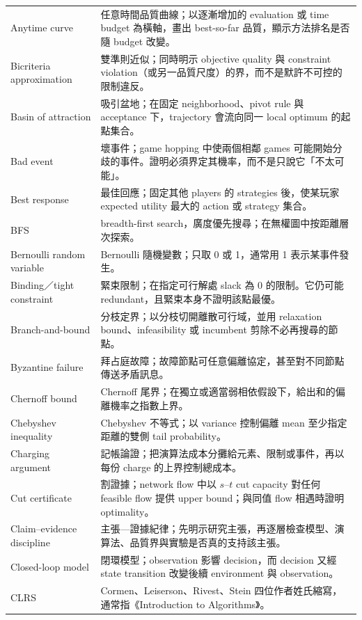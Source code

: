 \documentclass[11pt,a4paper,oneside,openany]{book}
\begin{document}
\begin{longtable}{@{}>{\raggedright\arraybackslash}p{}p{}@{}}
Anytime curve & 任意時間品質曲線；以逐漸增加的 evaluation 或 time budget 為橫軸，畫出 best-so-far 品質，顯示方法排名是否隨 budget 改變。 \\
Bicriteria approximation & 雙準則近似；同時明示 objective quality 與 constraint violation（或另一品質尺度）的界，而不是默許不可控的限制違反。 \\
Basin of attraction & 吸引盆地；在固定 neighborhood、pivot rule 與 acceptance 下，trajectory 會流向同一 local optimum 的起點集合。 \\
Bad event & 壞事件；game hopping 中使兩個相鄰 games 可能開始分歧的事件。證明必須界定其機率，而不是只說它「不太可能」。 \\
Best response & 最佳回應；固定其他 players 的 strategies 後，使某玩家 expected utility 最大的 action 或 strategy 集合。 \\
BFS & breadth-first search，廣度優先搜尋；在無權圖中按距離層次探索。 \\
Bernoulli random variable & Bernoulli 隨機變數；只取 0 或 1，通常用 1 表示某事件發生。 \\
Binding／tight constraint & 緊束限制；在指定可行解處 slack 為 0 的限制。它仍可能 redundant，且緊束本身不證明該點最優。 \\
Branch-and-bound & 分枝定界；以分枝切開離散可行域，並用 relaxation bound、infeasibility 或 incumbent 剪除不必再搜尋的節點。 \\
Byzantine failure & 拜占庭故障；故障節點可任意偏離協定，甚至對不同節點傳送矛盾訊息。 \\
Chernoff bound & Chernoff 尾界；在獨立或適當弱相依假設下，給出和的偏離機率之指數上界。 \\
Chebyshev inequality & Chebyshev 不等式；以 variance 控制偏離 mean 至少指定距離的雙側 tail probability。 \\
Charging argument & 記帳論證；把演算法成本分攤給元素、限制或事件，再以每份 charge 的上界控制總成本。 \\
Cut certificate & 割證據；network flow 中以 $s$--$t$ cut capacity 對任何 feasible flow 提供 upper bound；與同值 flow 相遇時證明 optimality。 \\
Claim--evidence discipline & 主張—證據紀律；先明示研究主張，再逐層檢查模型、演算法、品質界與實驗是否真的支持該主張。 \\
Closed-loop model & 閉環模型；observation 影響 decision，而 decision 又經 state transition 改變後續 environment 與 observation。 \\
CLRS & Cormen、Leiserson、Rivest、Stein 四位作者姓氏縮寫，通常指《Introduction to Algorithms》。 \\

\end{longtable}
\end{document}
